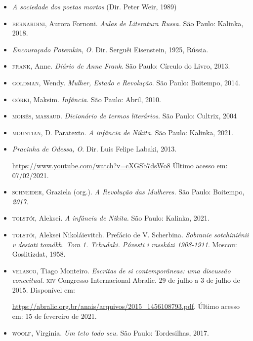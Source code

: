 \documentclass[11pt]{extarticle}
\begin{document}
\begin{itemize}
\item[]\emph{A sociedade dos poetas mortos} (Dir. Peter Weir, 1989)

\item[]\textsc{bernardini}, Aurora Fornoni. \emph{Aulas de Literatura Russa.} São Paulo:
Kalinka, 2018.

\item[]\emph{Encouraçado Potemkin}, \emph{O.} Dir. Serguêi Eisenstein, 1925,
Rússia.

\item[]\textsc{frank}, Anne. \emph{Diário de Anne Frank}. São Paulo: Círculo do Livro, 2013.

\item[]\textsc{goldman}, Wendy. \emph{Mulher, Estado e Revolução}. São Paulo: Boitempo,
2014.

\item[]\textsc{górki}, Maksim. \emph{Infância.} São Paulo: Abril, 2010.

\item[]\textsc{moisés, massaud}. \emph{Dicionário de termos literários}. São Paulo:
Cultrix, 2004

\item[]\textsc{mountian}, D. Paratexto. \emph{A infância de Nikita.} São Paulo: Kalinka,
2021.

\item[]\emph{Pracinha de Odessa, O}. Dir. Luis Felipe Labaki, 2013.

\url{https://www.youtube.com/watch?v=cXGSb7dsWo8} Último acesso em: 07/02/2021.

\item[]\textsc{schneider}, Graziela (org.). \emph{A Revolução das Mulheres.} São Paulo:
Boitempo, \emph{2017.}

\item[]\textsc{tolstói}, Aleksei. \emph{A infância de Nikita.} São Paulo: Kalinka, 2021.

\item[]\textsc{tolstói}, Aleksei Nikoláievitch. Prefácio de V. Scherbina. \emph{Sobranie
sotchiniénii v desiati tomákh. Tom 1. Tchudaki. Póvesti i rasskázi
1908-1911}. Moscou: Goslitizdat, 1958.

\item[]\textsc{velasco}, Tiago Monteiro. \emph{Escritas de si contemporâneas: uma
discussão conceitual.} \textsc{xiv} Congresso Internacional Abralic. 29 de julho
a 3 de julho de 2015. Disponível em:

\url{https://abralic.org.br/anais/arquivos/2015\_1456108793.pdf}.
Último acesso em: 15 de fevereiro de 2021.

\item[]\textsc{woolf}, Virginia. \emph{Um teto todo seu.} São Paulo: Tordesilhas, 2017.
\end{itemize}
\end{document}
